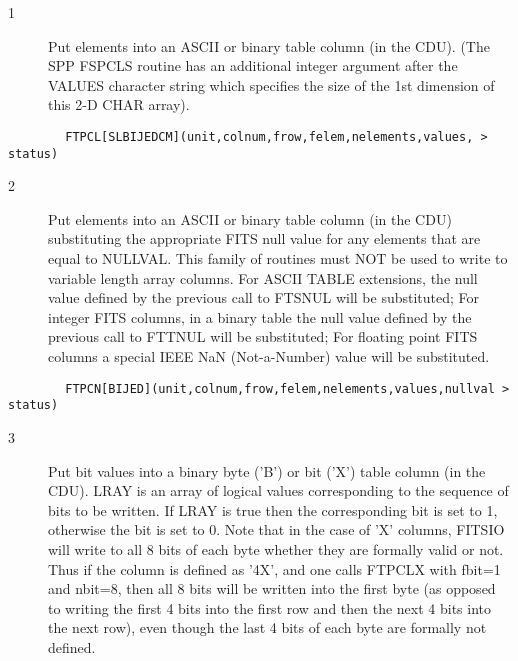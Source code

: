 \documentclass[11pt]{book}
\begin{document}
\begin{description}
\item[1 ] Put elements into an ASCII or binary table column (in the CDU).
    (The SPP FSPCLS routine has an additional integer argument after
    the VALUES character string which specifies the size of the 1st
   dimension of this 2-D CHAR array).
\end{description}

\begin{verbatim}
        FTPCL[SLBIJEDCM](unit,colnum,frow,felem,nelements,values, > status)
\end{verbatim}

\begin{description}
\item[2 ] Put elements into an ASCII or binary table column (in the CDU)
    substituting the appropriate FITS null value for any elements that
    are equal to NULLVAL.  This family of routines must NOT be used to
    write to  variable length array columns. For ASCII TABLE extensions, the
    null value defined by the previous call to FTSNUL will be substituted;
    For integer FITS columns, in a binary table  the null value
    defined by the previous call to FTTNUL will be substituted;
    For floating point FITS columns a special IEEE NaN (Not-a-Number)
   value will be substituted.
\end{description}

\begin{verbatim}
        FTPCN[BIJED](unit,colnum,frow,felem,nelements,values,nullval > status)
\end{verbatim}

\begin{description}
\item[3 ] Put bit values into a binary byte ('B') or bit ('X') table column (in the
    CDU).  LRAY is an array of logical values corresponding to the sequence of
    bits to be written.  If LRAY is true then the corresponding bit is
    set to 1, otherwise the bit is set to 0.  Note that in the case of
    'X' columns, FITSIO will write to all 8 bits of each byte whether
    they are formally valid or not.  Thus if the column is defined as
    '4X', and one calls FTPCLX with  fbit=1 and nbit=8, then all 8 bits
    will be written into the first byte (as opposed to writing the
    first 4 bits into the first row and then the next 4 bits into the
    next row), even though the last 4 bits of each byte are formally
   not defined.
\end{description}
\end{document}

